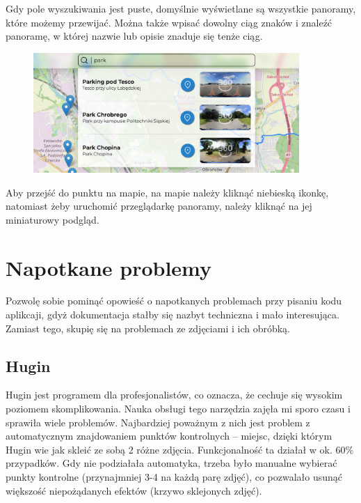 \documentclass[a4paper]{mwart}
\begin{document}
Gdy pole wyszukiwania jest puste, domyślnie wyświetlane są wszystkie panoramy,
które możemy przewijać. Można także wpisać dowolny ciąg znaków i znaleźć
panoramę, w której nazwie lub opisie znaduje się tenże ciąg.
\begin{figure}[H]
\centering
\includegraphics[width=0.9\textwidth]{images/search_query.jpg}
\end{figure}

Aby przejść do punktu na mapie, na mapie należy kliknąć niebieską ikonkę,
natomiast żeby uruchomić przeglądarkę panoramy, należy kliknąć na jej
miniaturowy podgląd.

\section{Napotkane problemy}
Pozwolę sobie pominąć opowieść o napotkanych problemach przy pisaniu kodu
aplikcaji, gdyż dokumentacja stałby się nazbyt techniczna i mało interesująca.
Zamiast tego, skupię się na problemach ze zdjęciami i ich obróbką.

\subsection{Hugin}
Hugin jest programem dla profesjonalistów, co oznacza, że cechuje się wysokim
poziomem skomplikowania. Nauka obsługi tego narzędzia zajęła mi sporo czasu i
sprawiła wiele problemów. Najbardziej poważnym z nich jest problem z
automatycznym znajdowaniem punktów kontrolnych -- miejsc, dzięki którym Hugin
wie jak skleić ze sobą 2 różne zdjęcia. Funkcjonalność ta działał w ok. 60\%
przypadków. Gdy nie podziałała automatyka, trzeba było manualne wybierać punkty
kontrolne (przynajmniej 3-4 na każdą parę zdjęć), co pozwalało usunąć większość
niepożądanych efektów (krzywo sklejonych zdjęć).
\end{document}
